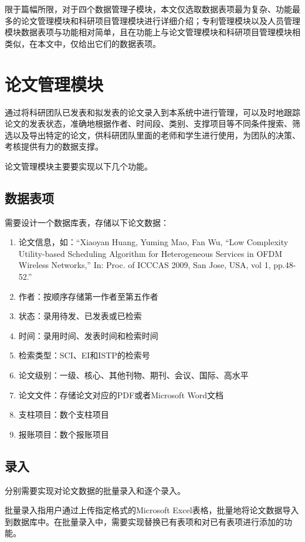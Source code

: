 
限于篇幅所限，对于四个数据管理子模块，本文仅选取数据表项最为复杂、功能最多的论文管理模块和科研项目管理模块进行详细介绍；专利管理模块以及人员管理模块数据表项与功能相对简单，且在功能上与论文管理模块和科研项目管理模块相类似，在本文中，仅给出它们的数据表项。
\section{论文管理模块}

通过将科研团队已发表和拟发表的论文录入到本系统中进行管理，可以及时地跟踪论文的发表状态，准确地根据作者、时间段、类别、支撑项目等不同条件搜索、筛选以及导出特定的论文，供科研团队里面的老师和学生进行使用，为团队的决策、考核提供有力的数据支撑。

论文管理模块主要要实现以下几个功能。

\subsection{数据表项}
需要设计一个数据库表，存储以下论文数据：
\begin{enumerate}
\item 论文信息，如：“Xiaoyan Huang, Yuming Mao, Fan Wu, ``Low Complexity Utility-based Scheduling Algorithm for Heterogeneous Services in OFDM Wireless Networks,'' In: Proc. of ICCCAS 2009, San Jose, USA, vol 1, pp.48-52.”
\item 作者：按顺序存储第一作者至第五作者
\item 状态：录用待发、已发表或已检索
\item 时间：录用时间、发表时间和检索时间
\item 检索类型：SCI、EI和ISTP的检索号
\item 论文级别：一级、核心、其他刊物、期刊、会议、国际、高水平
\item 论文文件：存储论文对应的PDF或者Microsoft Word文档
\item 支柱项目：数个支柱项目
\item 报账项目：数个报账项目
\end{enumerate}

\subsection{录入}
分别需要实现对论文数据的批量录入和逐个录入。

批量录入指用户通过上传指定格式的Microsoft Excel表格，批量地将论文数据导入到数据库中。在批量录入中，需要实现替换已有表项和对已有表项进行添加的功能。


